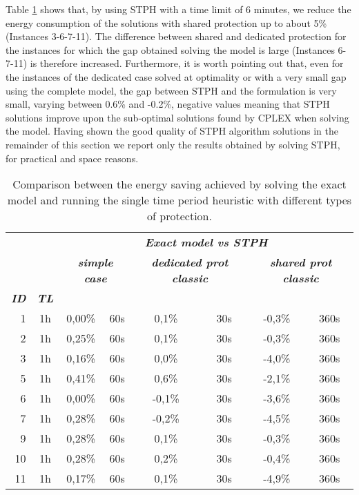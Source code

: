 \documentclass[final,5p,times,twocolumn]{elsarticle}
\begin{document}
Table \ref{tab:polska_model_vs_heur} shows that, by using STPH with a time limit of 6 minutes, we reduce the energy consumption of the solutions with shared protection up to about 5\% (Instances 3-6-7-11). The difference between shared and dedicated protection for the instances for which the gap obtained solving the model is large (Instances 6-7-11) is therefore increased. Furthermore, it is worth pointing out that, even for the instances of the dedicated case solved at optimality or with a very small gap using the complete model, the gap between STPH and the formulation is very small, varying between 0.6\% and -0.2\%, negative values meaning that STPH solutions improve upon the sub-optimal solutions found by CPLEX when solving the model. Having shown the good quality of STPH algorithm solutions in the remainder of this section we report only the results obtained by solving STPH,  for practical and space reasons.

\begin{table}[!htbp]
\centering
\scriptsize
\tabcolsep 3pt
\begin{tabular}{rccccccc}
& & \multicolumn{6}{c}{\textbf{\textit{Exact model vs STPH}}} \\
\cline{3-8}
& & \multicolumn{2}{c}{\textbf{\textit{simple case}}} & \multicolumn{2}{c}{\textbf{\textit{dedicated prot classic}}} & \multicolumn{2}{c}{\textbf{\textit{shared prot classic}}}  \\ 
\hline
\textbf{\textit{ID}} & \textbf{\textit{TL}} & \textbf{\textit{}} & \textbf{\textit{}} & \textbf{\textit{}} & \textbf{\textit{}} & \textbf{\textit{}} & \textbf{\textit{}} \\ 
\hline
1 & 1h & 0,00\% & 60s & 0,1\% & 30s & -0,3\% & 360s \\
2 & 1h & 0,25\% & 60s & 0,1\% & 30s & -0,3\% & 360s \\ 
3 & 1h & 0,16\% & 60s & 0,0\% & 30s & -4,0\% & 360s \\
5 & 1h & 0,41\% & 60s & 0,6\% & 30s & -2,1\% & 360s \\
6 & 1h & 0,00\% & 60s &-0,1\% & 30s & -3,6\% & 360s \\
7 & 1h & 0,28\% & 60s &-0,2\% & 30s & -4,5\% & 360s \\
9 & 1h & 0,28\% & 60s & 0,1\% & 30s & -0,3\% & 360s \\
10& 1h & 0,28\% & 60s & 0,2\% & 30s & -0,4\% & 360s \\
11& 1h & 0,17\% & 60s & 0,1\% & 30s & -4,9\% & 360s \\
\end{tabular}
\caption{Comparison between the energy saving achieved by solving the exact model and running the single time period heuristic with different types of protection.}
\label{tab:polska_model_vs_heur}
\end{table}
\end{document}
